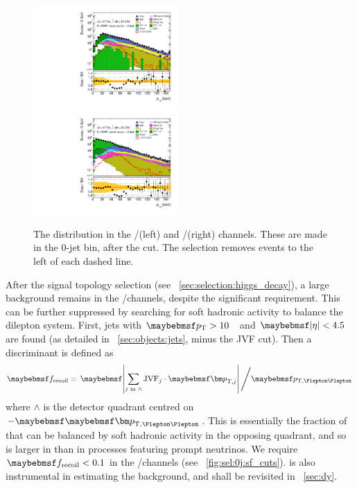 \begin{figure}[t]
	\includegraphics[width=0.495\textwidth]{tex/selection/emme_CutDPhillMET_0jet_Ptll_mh125_log}
	\hfill
	\includegraphics[width=0.495\textwidth]{tex/selection/eemm_CutDPhillMET_0jet_Ptll_mh125_log}
	\caption{The \ptll distribution in the \emch/\mech (left) and \eech/\mmch (right) 
	channels. These are made in the 0-jet bin, after the \dphillmet cut. The selection 
	removes events to the left of each dashed line.}
	\label{fig:sel:0j:ptll}
\end{figure}

After the signal topology selection (see \Section~\ref{sec:selection:higgs_decay}), a 
large \DYll background remains in the \eech/\mmch channels, despite the significant \met 
requirement. This can be further suppressed by searching for soft hadronic activity to 
balance the dilepton system. First, jets with \unit{$\pt > 10$}{\GeV} and $\mods{\eta} < 
4.5$ are found (as detailed in \Section~\ref{sec:objects:jets}, minus the JVF cut). 
Then a discriminant is defined as
\begin{equation}
	\frecoil = \left. \mods{\sum\limits_{j\text{ in }\wedge} \text{JVF}_{j} \cdot \bvec{p}_{\text{T,}j}} \, \middle/ \ptll \right.
	\label{eq:frecoil}
\end{equation}
where $\wedge$ is the detector quadrant centred on $-\ptllvec$. This is essentially the 
fraction of \ptll that can be balanced by soft hadronic activity in the opposing quadrant,
and so is larger in \DYll than in processes featuring prompt neutrinos. We require 
$\frecoil < 0.1$ in the \eech/\mmch channels (see \Figure~\ref{fig:sel:0j:sf_cuts}). 
\frecoil is also instrumental in estimating the \DYll background, and shall be revisited in 
\Section~\ref{sec:dy}.

